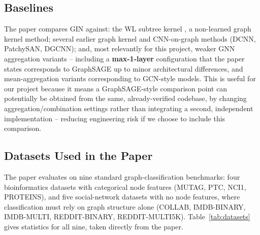 \documentclass[11pt]{article}
\begin{document}
\subsection{Baselines}
The paper compares GIN against: the WL subtree kernel \citep{shervashidze2011wlkernel}, a non-learned graph kernel method; several earlier graph kernel and CNN-on-graph methods (DCNN, PatchySAN, DGCNN); and, most relevantly for this project, weaker GNN aggregation variants -- including a \textbf{max-1-layer} configuration that the paper states corresponds to GraphSAGE \citep{hamilton2017graphsage} up to minor architectural differences, and mean-aggregation variants corresponding to GCN-style models. This is useful for our project because it means a GraphSAGE-style comparison point can potentially be obtained from the same, already-verified codebase, by changing aggregation/combination settings rather than integrating a second, independent implementation -- reducing engineering risk if we choose to include this comparison.

\subsection{Datasets Used in the Paper}
The paper evaluates on nine standard graph-classification benchmarks: four bioinformatics datasets with categorical node features (MUTAG, PTC, NCI1, PROTEINS), and five social-network datasets with no node features, where classification must rely on graph structure alone (COLLAB, IMDB-BINARY, IMDB-MULTI, REDDIT-BINARY, REDDIT-MULTI5K). Table~\ref{tab:datasets} gives statistics for all nine, taken directly from the paper.

\begin{table}[t]
\centering
{}
\caption{All nine benchmark datasets used in \citet{xu2019gin}; statistics as reported in the paper's own dataset table.}
\label{tab:datasets}
\end{table}
\end{document}
